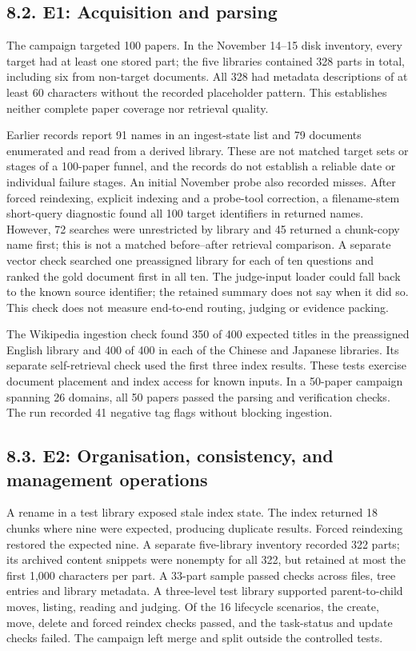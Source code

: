 \subsection{8.2. E1: Acquisition and parsing}

The campaign targeted 100 papers. In the November 14--15 disk inventory,
every target had at least one stored part; the five libraries contained 328
parts in total, including six from non-target documents. All 328 had
metadata descriptions of at least 60 characters without the recorded
placeholder pattern. This establishes neither complete paper coverage nor
retrieval quality.

Earlier records report 91 names in an ingest-state list and 79 documents
enumerated and read from a derived library. These are not matched target
sets or stages of a 100-paper funnel, and the records do not establish a
reliable date or individual failure stages. An initial November probe also
recorded misses. After forced reindexing, explicit indexing and a probe-tool
correction, a filename-stem short-query diagnostic found all 100 target
identifiers in returned names. However, 72 searches were unrestricted by
library and 45 returned a chunk-copy name first; this is not a matched
before--after retrieval comparison. A separate vector check searched one
preassigned library for each of ten questions and ranked the gold document
first in all ten. The judge-input loader could fall back to the known
source identifier; the retained summary does not say when it did so.
This check does not measure end-to-end routing, judging or evidence packing.

The Wikipedia ingestion check found 350 of 400 expected titles in the
preassigned English library and 400 of 400 in each of the Chinese and
Japanese libraries. Its separate self-retrieval check used the first
three index results. These tests exercise document placement and
index access for known inputs. In a 50-paper campaign spanning 26
domains, all 50 papers passed the parsing and verification checks.
The run recorded 41 negative tag flags without blocking ingestion.

\subsection{8.3. E2: Organisation, consistency, and management operations}

A rename in a test library exposed stale index state. The index returned
18 chunks where nine were expected, producing duplicate results. Forced
reindexing restored the expected nine. A separate five-library inventory
recorded 322 parts; its archived content snippets were nonempty for all
322, but retained at most the first 1,000 characters per part. A 33-part
sample passed checks across files, tree entries and
library metadata. A three-level
test library supported parent-to-child moves, listing, reading and
judging. Of the 16 lifecycle scenarios, the create, move, delete and
forced reindex checks passed, and the task-status and update checks
failed. The campaign left merge and split outside the controlled tests.

